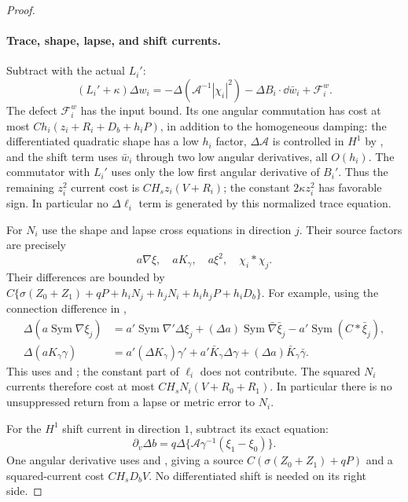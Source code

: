 \begin{proof}
\paragraph{Trace, shape, lapse, and shift currents.}
Subtract  with the actual $L_i'$:
\begin{equation}\label{dn:trace-difference-equation}
 (L_i'+\kappa)\Delta w_i
 =-\Delta(\mathcal A^{-1}|\chi_i|^2)
          -\Delta B_i\cdot\dd\bar w_i+\mathcal F_i^w.
\end{equation}
The defect $\mathcal F_i^w$ has the input bound.  Its one angular
commutation has cost at most
$Ch_i(z_i+R_i+D_b+h_iP)$, in addition to the homogeneous damping:
the differentiated quadratic shape has a low $h_i$ factor,
$\Delta\mathcal A$ is controlled in $H^1$ by ,
and the shift term uses $\bar w_i$ through two low angular
derivatives, all $O(h_i)$.  The commutator with $L_i'$ uses only
the low first angular derivative of $B_i'$.  Thus the remaining
$z_i^2$ current cost is $CH_sz_i(V+R_i)$; the constant
$2\kappa z_i^2$ has favorable sign.  In particular no
$\Delta\ell_i$ term is generated by this normalized trace equation.

For $N_i$ use the shape and lapse cross equations in direction $j$.
Their source factors are precisely
\[
 a\nabla\xi,\quad aK_\gamma,\quad a\xi^2,
                                      \quad \chi_i*\chi_j.
\]
Their differences are bounded by
$C\{\sigma(Z_0+Z_1)+qP+h_iN_j+h_jN_i+h_ih_jP+h_iD_b\}$.
For example, using the connection difference in
,
\begin{align*}
 \Delta(a\operatorname{Sym}\nabla\xi_j)
 &=a'\operatorname{Sym}\nabla'\Delta\xi_j
   +(\Delta a)\operatorname{Sym}\bar\nabla\bar\xi_j
   -a'\operatorname{Sym}(C*\bar\xi_j),\\
 \Delta(aK_\gamma\gamma)
 &=a'(\Delta K_\gamma)\gamma'
      +a'\bar K_\gamma\Delta\gamma
      +(\Delta a)\bar K_\gamma\bar\gamma.
\end{align*}
This uses  and
; the constant part of $\ell_i$
does not contribute.  The squared $N_i$ currents therefore cost
at most $CH_sN_i(V+R_0+R_1)$.  In particular there is no
unsuppressed return from a lapse or metric error to $N_i$.

For the $H^1$ shift current in direction $1$, subtract its exact
equation:
\[
 \partial_v\Delta b=q\Delta\{
             \mathcal A\gamma^{-1}(\xi_1-\xi_0)\}.
\]
One angular derivative uses  and
, giving a source
$C(\sigma(Z_0+Z_1)+qP)$ and a squared-current cost
$CH_sD_bV$.  No differentiated shift is needed on its right side.


\end{proof}
